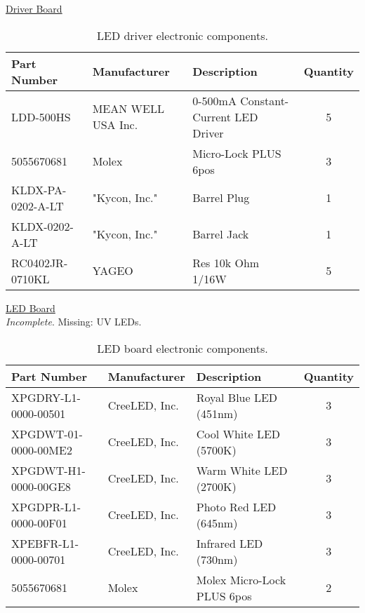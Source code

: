 \uline{Driver Board}
\begin{table}[!ht]
    \centering
    \begin{tabular}{|l|l|l|c|}
    \hline
        Part Number         & Manufacturer          & Description                           & Quantity  \\ \hline
        LDD-500HS           & MEAN WELL USA Inc.    & 0-500mA Constant-Current LED Driver   & 5         \\ \hline
        5055670681          & Molex                 & Micro-Lock PLUS 6pos                  & 3         \\ \hline
        KLDX-PA-0202-A-LT   & "Kycon, Inc."         & Barrel Plug                           & 1         \\ \hline
        KLDX-0202-A-LT      & "Kycon, Inc."         & Barrel Jack                           & 1         \\ \hline
        RC0402JR-0710KL     & YAGEO                 & Res 10k Ohm 1/16W                     & 5         \\ \hline
    \end{tabular}
    \caption{LED driver electronic components.}
    \label{tab:lighting_driver_components}
\end{table}

\uline{LED Board}\\
\textit{Incomplete}. Missing: UV LEDs.
\begin{table}[!ht]
    \centering
    \begin{tabular}{|l|l|l|c|}
    \hline
        Part Number             & Manufacturer  & Description                   & Quantity  \\ \hline
        XPGDRY-L1-0000-00501    & CreeLED, Inc. & Royal Blue LED (451nm)        & 3         \\ \hline
        XPGDWT-01-0000-00ME2    & CreeLED, Inc. & Cool White LED (5700K)        & 3         \\ \hline
        XPGDWT-H1-0000-00GE8    & CreeLED, Inc. & Warm White LED (2700K)        & 3         \\ \hline
        XPGDPR-L1-0000-00F01    & CreeLED, Inc. & Photo Red LED (645nm)         & 3         \\ \hline
        XPEBFR-L1-0000-00701    & CreeLED, Inc. & Infrared LED (730nm)          & 3         \\ \hline
        5055670681              & Molex         & Molex Micro-Lock PLUS 6pos    & 2         \\ \hline
    \end{tabular}
    \caption{LED board electronic components.}
    \label{tab:lighting_led_components}
\end{table}

